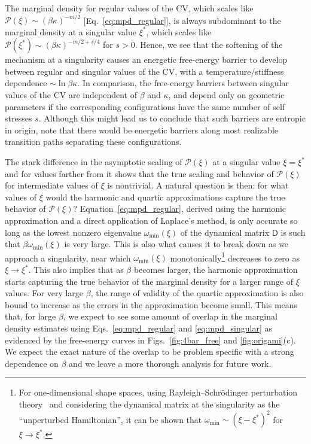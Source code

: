 The marginal density for regular values of the CV, which scales like $\mathscr{P}(\xi) \sim (\beta\kappa)^{-m/2}$ [Eq.~\eqref{eq:mpd_regular}], is always subdominant to the marginal density at a singular value $\xi^{*}$, which scales like $\mathscr{P}(\xi^{*}) \sim (\beta\kappa)^{-m/2 + s/4}$ for $s > 0$.
Hence, we see that the softening of the mechanism at a singularity causes an energetic free-energy barrier to develop between regular and singular values of the CV, with a temperature/stiffness dependence $\sim \ln \beta\kappa$.
In comparison, the free-energy barriers between singular values of the CV are independent of $\beta$ and $\kappa$, and depend only on geometric parameters if the corresponding configurations have the same number of self stresses $s$.
Although this might lead us to conclude that such barriers are entropic in origin, note that there would be energetic barriers along most realizable transition paths separating these configurations.

The stark difference in the asymptotic scaling of $\mathscr{P}(\xi)$ at a singular value $\xi = \xi^{*}$ and for values farther from it shows that the true scaling and behavior of $\mathscr{P}(\xi)$ for intermediate values of $\xi$ is nontrivial.
A natural question is then: for what values of $\xi$ would the harmonic and quartic approximations capture the true behavior of $\mathscr{P}(\xi)$?
Equation~\eqref{eq:mpd_regular}, derived using the harmonic approximation and a direct application of Laplace's method, is only accurate so long as the lowest nonzero eigenvalue $\omega_{\text{min}}(\xi)$ of the dynamical matrix $\mathsf{D}$ is such that $\beta\omega_{\text{min}}(\xi)$ is very large.
This is also what causes it to break down as we approach a singularity, near which $\omega_{\text{min}}(\xi)$ monotonically\footnote{For one-dimensional shape spaces, using Rayleigh--Schr\"{o}dinger perturbation theory~\cite{dirac1958} and considering the dynamical matrix at the singularity as the ``unperturbed Hamiltonian'', it can be shown that $\omega_{\text{min}} \sim (\xi - \xi^{*})^{2}$ for $\xi \to \xi^{*}$.} decreases to zero as $\xi \to \xi^{*}$.
This also implies that as $\beta$ becomes larger, the harmonic approximation starts capturing the true behavior of the marginal density for a larger range of $\xi$ values.
For very large $\beta$, the range of validity of the quartic approximation is also bound to increase as the errors in the approximation become small.
This means that, for large $\beta$, we expect to see some amount of overlap in the marginal density estimates using Eqs.~\eqref{eq:mpd_regular} and \eqref{eq:mpd_singular} as evidenced by the free-energy curves in Figs.~\ref{fig:4bar_free} and \ref{fig:origami}(c).
We expect the exact nature of the overlap to be problem specific with a strong dependence on $\beta$ and we leave a more thorough analysis for future work.

